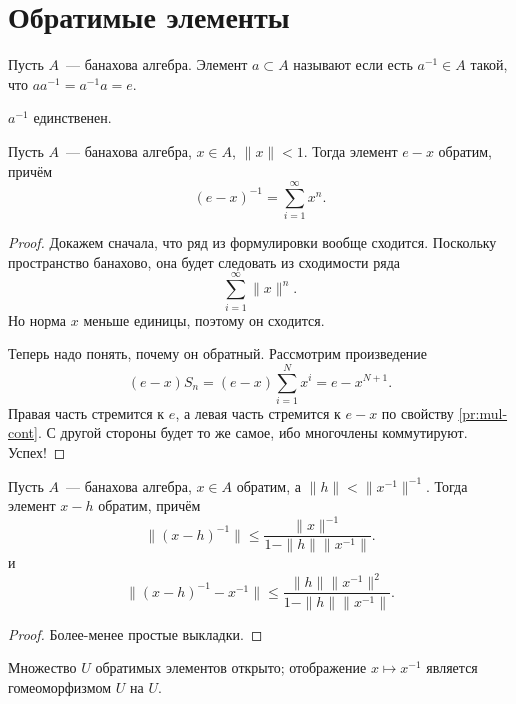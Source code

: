 \documentclass{notes}
\begin{document}
\section{Обратимые элементы}

	\begin{de}
		Пусть $A$~--- банахова алгебра. Элемент $a \subset A$ называют  если есть $a^{-1} \in A$ такой, что $a a^{-1} = a^{-1} a = e$.
	\end{de}

	\begin{st}
		$a^{-1}$ единственен.
	\end{st}

	\begin{thm}\label{thm:close-zero-inv}
		Пусть $A$~--- банахова алгебра, $x \in A$, $\|x\| < 1$. Тогда элемент $e - x$ обратим, причём
		\[
			(e - x)^{-1} = \sum\limits_{i = 1}^{\infty} x^n.
		\]
		\begin{proof}	
			Докажем сначала, что ряд из формулировки вообще сходится. Поскольку пространство банахово, она будет следовать из сходимости ряда
			\[
				\sum\limits_{i = 1}^{\infty} \|x\|^n.
			\]
			Но норма $x$ меньше единицы, поэтому он сходится.

			Теперь надо понять, почему он обратный. Рассмотрим произведение
			\[
				(e - x) S_n = (e - x)\sum\limits_{i = 1}^N x^i = e - x^{N+1}.
			\]
			Правая часть стремится к $e$, а левая часть стремится к $e - x$ по свойству \ref{pr:mul-cont}. С другой стороны будет то же самое, ибо многочлены коммутируют. Успех!
		\end{proof}
	\end{thm}

	\begin{thm} \label{thm:close-inv}
		Пусть $A$~--- банахова алгебра, $x \in A$ обратим, а $\|h\| < \|x^{-1}\|^{-1}$. Тогда элемент $x - h$ обратим, причём
		\[
			\big\|(x - h)^{-1}\big\|  \leqslant \dfrac{\|x\|^{-1}}{1 - \|h\| \|x^{-1}\|}. 
		\]
		и
		\[
			\big\|(x - h)^{-1} - x^{-1}\big\| \leqslant \dfrac{\|h\| \|x^{-1}\|^2}{1 - \|h\| \|x^{-1}\|}.
		\]
		\begin{proof}
			Более-менее простые выкладки.
		\end{proof}
	\end{thm}

	\begin{cor}
		Множество $U$ обратимых элементов открыто; отображение $x \mapsto x^{-1}$ является гомеоморфизмом $U$ на $U$.
	\end{cor}
\end{document}
